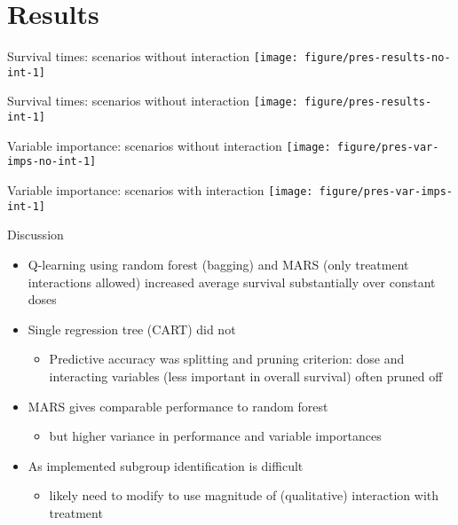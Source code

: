 \documentclass{beamer}
\begin{document}
\section{Results} %
\label{sec:results}


\begin{frame}[c]{Survival times: scenarios without interaction}
\centering
  \texttt{[image: figure/pres-results-no-int-1]} 
\end{frame}

\begin{frame}[c]{Survival times: scenarios without interaction}
  \centering
  \texttt{[image: figure/pres-results-int-1]} 
\end{frame}

\begin{frame}[c]{Variable importance: scenarios without interaction}
\centering
  \texttt{[image: figure/pres-var-imps-no-int-1]} 
\end{frame}

\begin{frame}[c]{Variable importance: scenarios with interaction}
  \centering
  \texttt{[image: figure/pres-var-imps-int-1]} 
\end{frame}


\begin{frame}[t]{Discussion}
  \begin{itemize}[<+->]
    \item Q-learning using random forest (bagging) and MARS (only treatment interactions allowed) increased average survival substantially over constant doses
    \item Single regression tree (CART) did not
    \begin{itemize}
      \item Predictive accuracy was splitting and pruning criterion: dose and interacting variables (less important in overall survival) often pruned off 
    \end{itemize}
    \item MARS gives comparable performance to random forest
    \begin{itemize}
      \item but higher variance in performance and variable importances
    \end{itemize} 
    \item As implemented subgroup identification is difficult
    \begin{itemize} 
      \item likely need to modify to use magnitude of (qualitative) interaction with treatment
    \end{itemize}  
  \end{itemize}
\end{frame}
\end{document}
